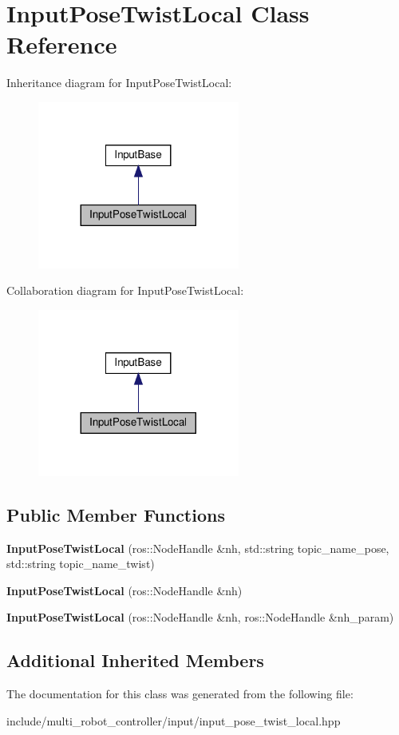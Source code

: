 \hypertarget{classInputPoseTwistLocal}{}\section{Input\+Pose\+Twist\+Local Class Reference}
\label{classInputPoseTwistLocal}


Inheritance diagram for Input\+Pose\+Twist\+Local\+:\nopagebreak
\begin{figure}[H]
\begin{center}
\leavevmode
\includegraphics[width=188pt]{de/d87/classInputPoseTwistLocal__inherit__graph}
\end{center}
\end{figure}


Collaboration diagram for Input\+Pose\+Twist\+Local\+:\nopagebreak
\begin{figure}[H]
\begin{center}
\leavevmode
\includegraphics[width=188pt]{de/ddd/classInputPoseTwistLocal__coll__graph}
\end{center}
\end{figure}
\subsection*{Public Member Functions}
\begin{DoxyCompactItemize}
\item 
{\bfseries Input\+Pose\+Twist\+Local} (ros\+::\+Node\+Handle \&nh, std\+::string topic\+\_\+name\+\_\+pose, std\+::string topic\+\_\+name\+\_\+twist)
\item 
{\bfseries Input\+Pose\+Twist\+Local} (ros\+::\+Node\+Handle \&nh)
\item 
{\bfseries Input\+Pose\+Twist\+Local} (ros\+::\+Node\+Handle \&nh, ros\+::\+Node\+Handle \&nh\+\_\+param)
\end{DoxyCompactItemize}
\subsection*{Additional Inherited Members}


The documentation for this class was generated from the following file\+:\begin{DoxyCompactItemize}
\item 
include/multi\+\_\+robot\+\_\+controller/input/input\+\_\+pose\+\_\+twist\+\_\+local.\+hpp\end{DoxyCompactItemize}
